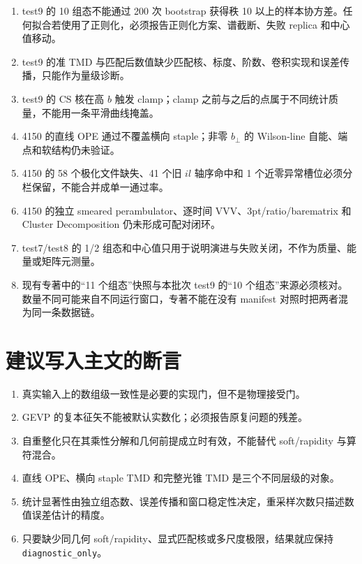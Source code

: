 \begin{enumerate}
  \item test9 的 10 组态不能通过 200 次 bootstrap 获得秩 10 以上的样本协方差。任何拟合若使用了正则化，必须报告正则化方案、谱截断、失败 replica 和中心值移动。
  \item test9 的准 TMD 与匹配后数值缺少匹配核、标度、阶数、卷积实现和误差传播，只能作为量级诊断。
  \item test9 的 CS 核在高 \(b\) 触发 clamp；clamp 之前与之后的点属于不同统计质量，不能用一条平滑曲线掩盖。
  \item 4150 的直线 OPE 通过不覆盖横向 staple；非零 \(b_\perp\) 的 Wilson-line 自能、端点和软结构仍未验证。
  \item 4150 的 58 个极化文件缺失、41 个旧 \(il\) 轴序命中和 1 个近零异常槽位必须分栏保留，不能合并成单一通过率。
  \item 4150 的独立 smeared perambulator、逐时间 VVV、3pt/ratio/barematrix 和 Cluster Decomposition 仍未形成可配对闭环。
  \item test7/test8 的 1/2 组态和中心值只用于说明演进与失败关闭，不作为质量、能量或矩阵元测量。
  \item 现有专著中的“11 个组态”快照与本批次 test9 的“10 个组态”来源必须核对。数量不同可能来自不同运行窗口，专著不能在没有 manifest 对照时把两者混为同一条数据链。
\end{enumerate}

\section{建议写入主文的断言}

\begin{enumerate}
  \item 真实输入上的数组级一致性是必要的实现门，但不是物理接受门。
  \item GEVP 的复本征矢不能被默认实数化；必须报告原复问题的残差。
  \item 自重整化只在其乘性分解和几何前提成立时有效，不能替代 soft/rapidity 与算符混合。
  \item 直线 OPE、横向 staple TMD 和完整光锥 TMD 是三个不同层级的对象。
  \item 统计显著性由独立组态数、误差传播和窗口稳定性决定，重采样次数只描述数值误差估计的精度。
  \item 只要缺少同几何 soft/rapidity、显式匹配核或多尺度极限，结果就应保持 \texttt{diagnostic\_only}。
\end{enumerate}
